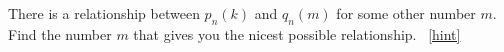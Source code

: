 \documentclass{book}
\begin{document}
\setcounter{project}{312}
\addtocounter{project}{-1}
\begin{activity}[]\label{activity-305}
\hypertarget{p-1597}{}%
There is a relationship between \(p_n(k)\) and \(q_n(m)\) for some other number \(m\). Find the number \(m\) that gives you the nicest possible relationship.%
~\hfill{\tiny\hyperlink{a-312}{[hint]}\hypertarget{q-312}{}}\end{activity}
\end{document}
